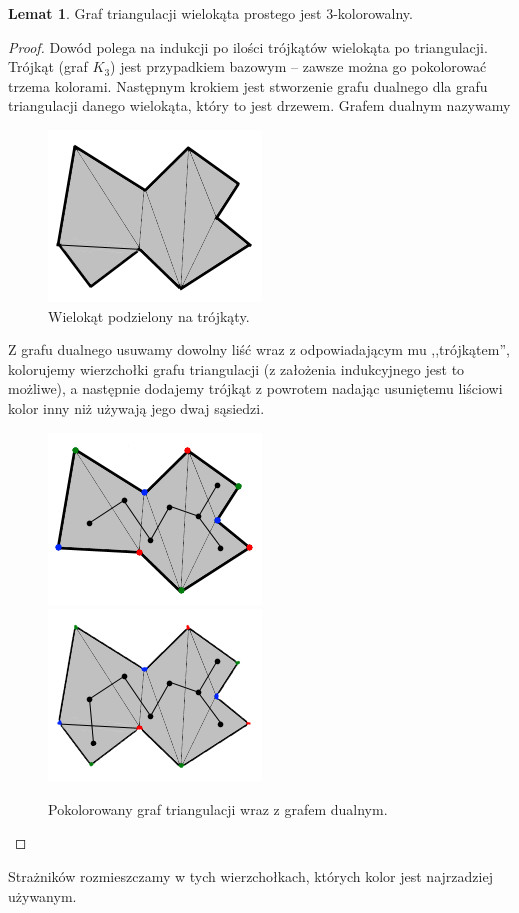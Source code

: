 \documentclass[brudnopis]{xmgr}
\theoremstyle{definition}
\newtheorem{Lemat}{Lemat}
\begin{document}
\begin{Lemat} \cite{fisk}
Graf triangulacji wielokąta prostego jest $3$-kolorowalny.
\end{Lemat}
\begin{proof}
	Dowód polega na indukcji po ilości trójkątów wielokąta po triangulacji. Trójkąt (graf $K_3$) jest przypadkiem bazowym -- zawsze można go pokolorować trzema kolorami. Następnym krokiem jest stworzenie grafu  dualnego dla grafu triangulacji danego wielokąta, który to jest drzewem. Grafem dualnym nazywamy 
	\begin{figure}[ht!]
	  \centering
	  \includegraphics{rysunki/dual.png}
	    \caption{Wielokąt podzielony na trójkąty.}
	\end{figure} 
	Z grafu dualnego usuwamy dowolny liść wraz z odpowiadającym mu ,,trójkątem'', kolorujemy wierzchołki grafu triangulacji (z założenia indukcyjnego jest to możliwe), a następnie dodajemy trójkąt z powrotem nadając usuniętemu liściowi kolor inny niż używają jego dwaj sąsiedzi.
  \begin{figure}[ht!]
    \centering
      \includegraphics{rysunki/dual_kolor.png} 
      \includegraphics{rysunki/dual_caly_kolor.png}
      \caption{Pokolorowany graf triangulacji wraz z grafem dualnym.}
  \end{figure} 
\end{proof}
	Strażników rozmieszczamy w tych wierzchołkach, których kolor jest najrzadziej używanym.
\end{document}

